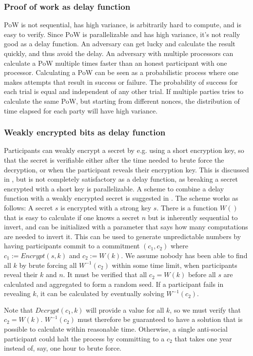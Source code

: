 \subsubsection{Proof of work as delay function}
PoW is not sequential, has high variance, is arbitrarily hard to compute, and is easy to verify. Since PoW is parallelizable and has high variance, it's not really good as a delay function. An adversary can get lucky and calculate the result quickly, and thus avoid the delay. An adversary with multiple processors can calculate a PoW multiple times faster than an honest participant with one processor. Calculating a PoW can be seen as a probabilistic process where one makes attempts that result in success or failure. The probability of success for each trial is equal and independent of any other trial. If multiple parties tries to calculate the same PoW, but starting from different nonces, the distribution of time elapsed for each party will have high variance.  

\subsubsection{Weakly encrypted bits as delay function}
Participants can weakly encrypt a secret by e.g. using a short encryption key, so that the secret is verifiable either after the time needed to brute force the decryption, or when the participant reveals their encryption key.
This is discussed in \cite{syverson_weakly_1998}, but is not completely satisfactory as a delay function, as breaking a secret encrypted with a short key is parallelizable. 
A scheme to combine a delay function with a weakly encrypted secret is suggested in \cite{rivest_time-lock_1996}. The scheme works as follows: A secret $s$ is encrypted with a strong key $s$. There is a function $W()$ that is easy to calculate if one knows a secret $n$ but is inherently sequential to invert, and can be initialized with a parameter that says how many computations are needed to invert it.
This can be used to generate unpredictable numbers by having participants commit to a commitment $(c_1, c_2)$ where $c_1:=Encrypt(s, k)$ and $c_2:=W(k)$. We assume nobody has been able to find all $k$ by brute forcing all $W^{-1}(c_2)$ within some time limit, when participants reveal their $k$ and $n$. It must be verified that all $c_2=W(k)$ before all $s$ are calculated and aggregated to form a random seed. If a participant fails in revealing $k$, it can be calculated by eventually solving $W^{-1}(c_2)$.

Note that $Decrypt(c_1, k)$ will provide a value for all $k$, so we must verify that $c_2=W(k)$. $W^{-1}(c_2)$ must therefore be guaranteed to have a solution that is possible to calculate within reasonable time. Otherwise, a single anti-social participant could halt the process by committing to a $c_2$ that takes one year instead of, say, one hour to brute force. 


